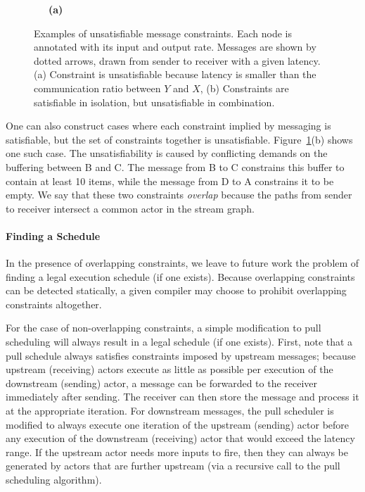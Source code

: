 \begin{figure}[t]
\begin{center}
\hspace{0.7in}
 \vspace{6pt}

{\tiny ~}{\tiny ~}~{\bf (a)}\hspace{1in}{\bf (b)}~~~{\tiny ~}{\tiny ~}
\vspace{-3pt}
\caption{{\small Examples of unsatisfiable message constraints.  Each
node is annotated with its input and output rate.  Messages are shown
by dotted arrows, drawn from sender to receiver with a given latency.
(a) Constraint is unsatisfiable because latency is smaller than the
communication ratio between $Y$ and $X$, (b) Constraints are
satisfiable in isolation, but unsatisfiable in combination.
\protect\label{fig:infeasible}}}
\end{center}
\vspace{-18pt}
\end{figure}

One can also construct cases where each constraint implied by
messaging is satisfiable, but the set of constraints together is
unsatisfiable.  Figure~\ref{fig:infeasible}(b) shows one such case.
The unsatisfiability is caused by conflicting demands on the buffering
between B and C.  The message from B to C constrains this buffer to
contain at least 10 items, while the message from D to A constrains it
to be empty.  We say that these two constraints {\it overlap} because
the paths from sender to receiver intersect a common actor in the
stream graph.

\paragraph*{Finding a Schedule}
In the presence of overlapping constraints, we leave to future work
the problem of finding a legal execution schedule (if one exists).
Because overlapping constraints can be detected statically, a given
compiler may choose to prohibit overlapping constraints altogether.

For the case of non-overlapping constraints, a simple modification to
pull scheduling will always result in a legal schedule (if one
exists).  First, note that a pull schedule always satisfies
constraints imposed by upstream messages; because upstream (receiving)
actors execute as little as possible per execution of the downstream
(sending) actor, a message can be forwarded to the receiver
immediately after sending.  The receiver can then store the message
and process it at the appropriate iteration.  For downstream messages,
the pull scheduler is modified to always execute one iteration of the
upstream (sending) actor before any execution of the downstream
(receiving) actor that would exceed the latency range.  If the
upstream actor needs more inputs to fire, then they can always be
generated by actors that are further upstream (via a recursive call to
the pull scheduling algorithm).


